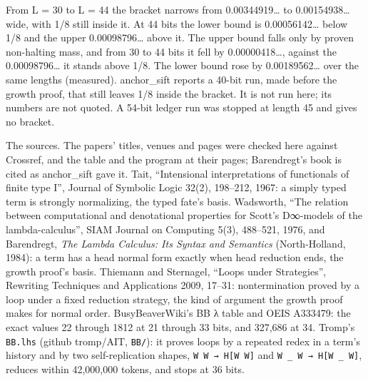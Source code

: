 From L = 30 to L = 44 the bracket narrows from 0.00344919… to 0.00154938… wide, with 1/8 still inside it. At 44 bits the lower bound is 0.00056142… below 1/8 and the upper 0.00098796… above it. The upper bound falls only by proven non-halting mass, and from 30 to 44 bits it fell by 0.00000418…, against the 0.00098796… it stands above 1/8. The lower bound rose by 0.00189562… over the same lengths (measured). anchor\_\allowbreak{}sift reports a 40-bit run, made before the growth proof, that still leaves 1/8 inside the bracket. It is not run here; its numbers are not quoted. A 54-bit ledger run was stopped at length 45 and gives no bracket.

The sources. The papers' titles, venues and pages were checked here against Crossref, and the table and the program at their pages; Barendregt's book is cited as anchor\_\allowbreak{}sift gave it. Tait, “Intensional interpretations of functionals of finite type I”, Journal of Symbolic Logic 32(2), 198–212, 1967: a simply typed term is strongly normalizing, the typed fate's basis. Wadsworth, “The relation between computational and denotational properties for Scott's D∞-models of the lambda-calculus”, SIAM Journal on Computing 5(3), 488–521, 1976, and Barendregt, \emph{The Lambda Calculus: Its Syntax and Semantics} (North-Holland, 1984): a term has a head normal form exactly when head reduction ends, the growth proof's basis. Thiemann and Sternagel, “Loops under Strategies”, Rewriting Techniques and Applications 2009, 17–31: nontermination proved by a loop under a fixed reduction strategy, the kind of argument the growth proof makes for normal order. BusyBeaverWiki's BB λ table and OEIS A333479: the exact values 22 through 1812 at 21 through 33 bits, and 327,686 at 34. Tromp's \texttt{BB.\allowbreak{}lhs} (github tromp/AIT, \texttt{BB/\allowbreak{}}): it proves loops by a repeated redex in a term's history and by two self-replication shapes, \texttt{W W → H[W W]} and \texttt{W \_\allowbreak{} W → H[W \_\allowbreak{} W]}, reduces within 42,000,000 tokens, and stops at 36 bits.
